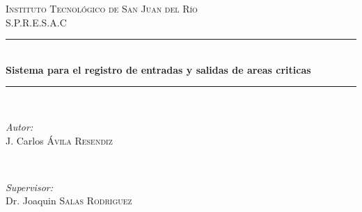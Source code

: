\documentclass[12pt]{article} %
\begin{document}

\begin{titlepage}

\newcommand{\HRule}{\rule{\linewidth}{0.5mm}} %

\center %
 

\textsc{\LARGE Instituto Tecnológico de San Juan del Río}\\[1.5cm] %
\textsc{\Large S.P.R.E.S.A.C}\\[0.5cm] %


\HRule \\[0.4cm]
{ \huge \bfseries Sistema para el registro de entradas y salidas de areas criticas}\\[0.4cm] %
\HRule \\[1.5cm]
 

\begin{minipage}{0.4\textwidth}
\begin{flushleft} \large
\emph{Autor:}\\
J. Carlos \textsc{\'Avila Resendiz} %
\end{flushleft}
\end{minipage}
~
\begin{minipage}{0.4\textwidth}
\begin{flushright} \large
\emph{Supervisor:} \\
Dr. Joaquin  \textsc{Salas Rodriguez} %
\end{flushright}
\end{minipage}\\[4cm]


\end{titlepage}
\end{document}
